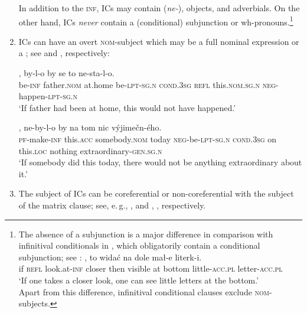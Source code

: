 \documentclass[output=paper,colorlinks,citecolor=brown,newtxmath]{langsci/langscibook}
\begin{document}
\begin{enumerate}
In addition to the \textsc{inf}, ICs may contain  (\textit{ne-}), objects, and adverbials. On the other hand, ICs \textit{never} contain a (conditional) subjunction or wh-pronouns.\footnote{The absence of a subjunction is a major difference in comparison with infinitival conditionals in , which obligatorily contain a conditional subjunction; see :
\ea\label{ex:Polish}
, to widać na dole mał-e literk-i.\\
     {} if \textsc{refl} look.at-\textsc{inf} closer then visible at bottom little-\textsc{acc.pl} letter-\textsc{acc.pl}\\
\glt `If one takes a closer look, one can see little letters at the bottom.' \\ \hfill \citep[;][455]{EngelKuc1999}
\z
Apart from this difference,  infinitival conditional clauses exclude \textsc{nom}-subjects.}

\item ICs can have an overt \textsc{nom}-subject which may be a full nominal expression or a ; see  and , respectively:

\ea\label{ex:father}
, by-l-o by se to ne-sta-l-o.\\
     {} be-\textsc{inf} father.\textsc{nom} {at.home} be-\textsc{lpt-sg.n} \textsc{cond.3sg} \textsc{refl} this.\textsc{nom.sg.n} \textsc{neg}-happen-\textsc{lpt-sg.n}\\
\glt `If father had been at home, this would not have happened.' \\ \hfill \citep[;][65]{Svoboda1960a}
\z

\ea\label{ex:extraordinary}
, ne-by-l-o by na tom nic výjimečn-ého.\\
     {} \textsc{pf}-make-\textsc{inf} this.\textsc{acc} somebody.\textsc{nom} today \textsc{neg}-be-\textsc{lpt-sg.n} \textsc{cond.3sg} on this.\textsc{loc} nothing extraordinary-\textsc{gen.sg.n}\\
\glt `If somebody did this today, there would not be anything extraordinary about it.' \hfill \citep[;][1]{Milotova2012}
\z

\item The subject of ICs can be coreferential or non-coreferential with the subject of the matrix clause; see, e.\,g., ,  and , , respectively.


\end{enumerate}
\end{document}
